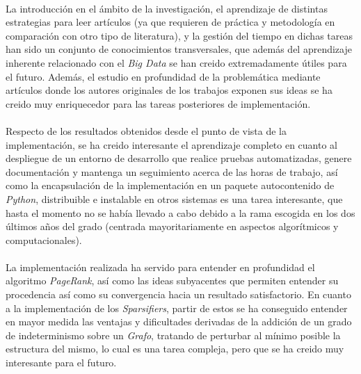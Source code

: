 \documentclass{subfiles}
\begin{document}
      \paragraph{}
      La introducción en el ámbito de la investigación, el aprendizaje de distintas estrategias para leer artículos (ya que requieren de práctica y metodología en comparación con otro tipo de literatura), y la gestión del tiempo en dichas tareas han sido un conjunto de conocimientos transversales, que además del aprendizaje inherente relacionado con el \emph{Big Data} se han creido extremadamente útiles para el futuro. Además, el estudio en profundidad de la problemática mediante artículos donde los autores originales de los trabajos exponen sus ideas se ha creido muy enriquecedor para las tareas posteriores de implementación.

      \paragraph{}
      Respecto de los resultados obtenidos desde el punto de vista de la implementación, se ha creido interesante el aprendizaje completo en cuanto al despliegue de un entorno de desarrollo que realice pruebas automatizadas, genere documentación y mantenga un seguimiento acerca de las horas de trabajo, así como la encapsulación de la implementación en un paquete autocontenido de \emph{Python}, distribuible e instalable en otros sistemas es una tarea interesante, que hasta el momento no se había llevado a cabo debido a la rama escogida en los dos últimos años del grado (centrada mayoritariamente en aspectos algorítmicos y computacionales).

      \paragraph{}
      La implementación realizada ha servido para entender en profundidad el algoritmo \emph{PageRank}, así como las ideas subyacentes que permiten entender su procedencia así como su convergencia hacia un resultado satisfactorio. En cuanto a la implementación de los \emph{Sparsifiers}, partir de estos se ha conseguido entender en mayor medida las ventajas y dificultades derivadas de la addición de un grado de indeterminismo sobre un \emph{Grafo}, tratando de perturbar al mínimo posible la estructura del mismo, lo cual es una tarea compleja, pero que se ha creido muy interesante para el futuro.
\end{document}
